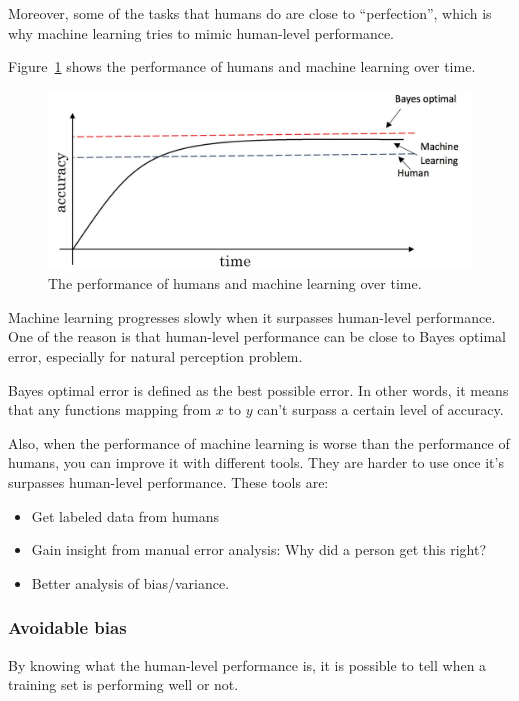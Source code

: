 \documentclass[UTF8]{article}
\begin{document}
Moreover, some of the tasks that humans do are close to ``perfection'', which is why machine
learning tries to mimic human-level performance.

Figure~\ref{fig:human-level} shows the performance of humans and machine learning over time.

\begin{figure}[htb]
    \centering
    \includegraphics[width=40em]{figures/human-level}
    \caption{The performance of humans and machine learning over time.}
    \label{fig:human-level}
\end{figure}

Machine learning progresses slowly when it surpasses human-level performance. One of the reason is
that human-level performance can be close to Bayes optimal error, especially for natural perception
problem.

Bayes optimal error is defined as the best possible error. In other words, it means that any
functions mapping from $x$ to $y$ can't surpass a certain level of accuracy.

Also, when the performance of machine learning is worse than the performance of humans, you can
improve it with different tools. They are harder to use once it's surpasses human-level performance.
These tools are:
\begin{itemize}
    \item Get labeled data from humans
    \item Gain insight from manual error analysis: Why did a person get this right?
    \item Better analysis of bias/variance.
\end{itemize}

\subsubsection{Avoidable bias}
By knowing what the human-level performance is, it is possible to tell when a training set is
performing well or not.
\end{document}
